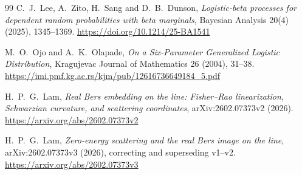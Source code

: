 \documentclass[11pt]{article}
\begin{document}
\begin{thebibliography}{99}
C.~J.~Lee, A.~Zito, H.~Sang and D.~B.~Dunson,
\emph{Logistic-beta processes for dependent random probabilities with beta marginals},
Bayesian Analysis 20(4) (2025), 1345--1369.
\url{https://doi.org/10.1214/25-BA1541}

M.~O.~Ojo and A.~K.~Olapade,
\emph{On a Six-Parameter Generalized Logistic Distribution},
Kragujevac Journal of Mathematics 26 (2004), 31--38.
\url{https://imi.pmf.kg.ac.rs/kjm/pub/12616736649184_5.pdf}

H.~P.~G.~Lam,
\emph{Real Bers embedding on the line: Fisher--Rao linearization, Schwarzian curvature, and scattering coordinates},
arXiv:2602.07373v2 (2026).
\url{https://arxiv.org/abs/2602.07373v2}

H.~P.~G.~Lam,
\emph{Zero-energy scattering and the real Bers image on the line},
arXiv:2602.07373v3 (2026), correcting and superseding v1--v2.
\url{https://arxiv.org/abs/2602.07373v3}
\end{thebibliography}
\end{document}
